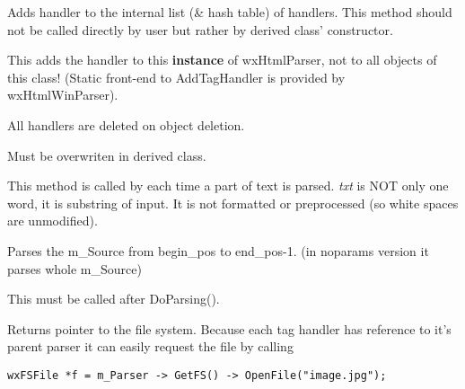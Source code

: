 \label{wxhtmlparseraddtaghandler}


Adds handler to the internal list (\& hash table) of handlers. This
method should not be called directly by user but rather by derived class'
constructor.

This adds the handler to this {\bf instance} of wxHtmlParser, not to
all objects of this class! (Static front-end to AddTagHandler is provided
by wxHtmlWinParser).

All handlers are deleted on object deletion.

\label{wxhtmlparseraddword}


Must be overwriten in derived class.

This method is called by 
each time a part of text is parsed. {\it txt} is NOT only one word, it is
substring of input. It is not formatted or preprocessed (so white spaces are
unmodified).

\label{wxhtmlparserdoparsing}



Parses the m\_Source from begin\_pos to end\_pos-1.
(in noparams version it parses whole m\_Source)

\label{wxhtmlparserdoneparser}


This must be called after DoParsing().

\label{wxhtmlparsergetfs}


Returns pointer to the file system. Because each tag handler has
reference to it's parent parser it can easily request the file by
calling

\begin{verbatim}
wxFSFile *f = m_Parser -> GetFS() -> OpenFile("image.jpg");
\end{verbatim}

\label{wxhtmlparsergetproduct}

